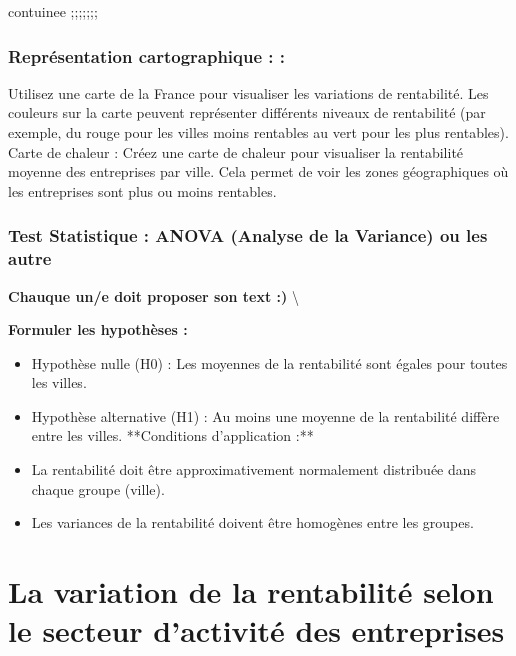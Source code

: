 \documentclass[mstat,12pt]{unswthesis}
\begin{document}
contuinee ;;;;;;;

\subsubsection{Représentation cartographique :
:}\label{repruxe9sentation-cartographique}

\bigskip

Utilisez une carte de la France pour visualiser les variations de
rentabilité. \bigskip Les couleurs sur la carte peuvent représenter
différents niveaux de rentabilité (par exemple, du rouge pour les villes
moins rentables au vert pour les plus rentables). \bigskip Carte de
chaleur : Créez une carte de chaleur pour visualiser la rentabilité
moyenne des entreprises par ville. Cela permet de voir les zones
géographiques où les entreprises sont plus ou moins rentables.

\subsubsection{Test Statistique : ANOVA (Analyse de la Variance) ou les
autre}\label{test-statistique-anova-analyse-de-la-variance-ou-les-autre-2}

\textbf{Chauque un/e doit proposer son text :) }\textbackslash{}
\bigskip

\textbf{Formuler les hypothèses :} \bigskip

\begin{itemize}[label=$\circ$]
\item Hypothèse nulle (H0) : Les moyennes de la rentabilité sont égales
pour toutes les villes.
\item Hypothèse alternative (H1) : Au moins une moyenne de la
rentabilité diffère entre les villes.
\bigskip
**Conditions d'application :**
\bigskip
\item La rentabilité doit être approximativement normalement distribuée
dans chaque groupe (ville).
\item Les variances de la rentabilité doivent être homogènes entre les
groupes.
\end{itemize}

\newpage

\section{\texorpdfstring{\textbf{La variation de la rentabilité selon le
secteur d'activité des
entreprises}}{La variation de la rentabilité selon le secteur d'activité des entreprises}}\label{la-variation-de-la-rentabilituxe9-selon-le-secteur-dactivituxe9-des-entreprises}
\end{document}

